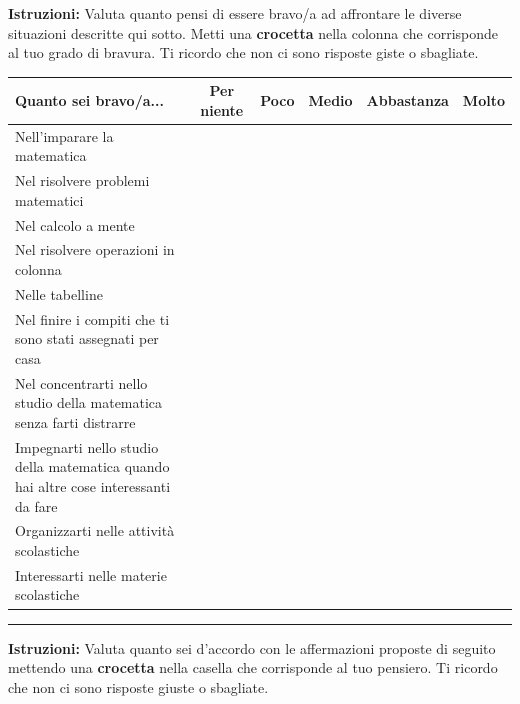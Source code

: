 \newpage

\noindent\textbf{Istruzioni:} Valuta quanto pensi di essere bravo/a ad affrontare le diverse situazioni descritte qui sotto. Metti una \textbf{crocetta} nella colonna che corrisponde al tuo grado di bravura. Ti ricordo che non ci sono risposte giste o sbagliate. 
\newline

\noindent\begin{tabular}{|p{7cm}|c|c|c|c|c|}
  \hline
  \textbf{Quanto sei bravo/a...} & \textbf{Per niente} & \textbf{Poco} & \textbf{Medio} & \textbf{Abbastanza} & \textbf{Molto} \\
  \hline
  Nell'imparare la matematica & & & & & \\
  \hline
  Nel risolvere problemi matematici & & & & & \\
  \hline
  Nel calcolo a mente & & & & & \\
  \hline
  Nel risolvere operazioni in colonna & & & & & \\
  \hline
  Nelle tabelline & & & & & \\
  \hline
  Nel finire i compiti che ti sono stati assegnati per casa & & & & & \\
  \hline 
  Nel concentrarti nello studio della matematica senza farti distrarre & & & & & \\
  \hline
  Impegnarti nello studio della matematica quando hai altre cose interessanti da fare & & & & & \\
  \hline
  Organizzarti nelle attività scolastiche & & & & & \\
  \hline
  Interessarti nelle materie scolastiche & & & & & \\
  \hline
\end{tabular}

\newpage

\medskip\hrule \medskip 
\noindent\textbf{Istruzioni:} Valuta quanto sei d'accordo con le affermazioni proposte di seguito mettendo una \textbf{crocetta} nella casella che corrisponde al tuo pensiero. Ti ricordo che non ci sono risposte giuste o sbagliate. 
\newline

